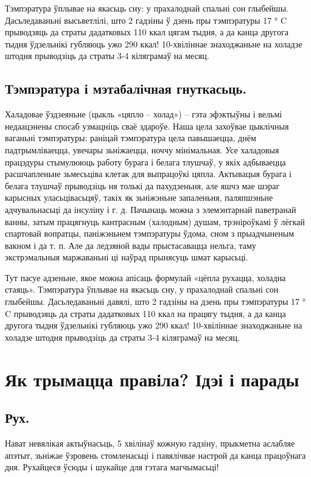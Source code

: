 Тэмпэратура ўплывае на якасьць сну: у прахалоднай спальні сон глыбейшы. Дасьледаваньні высьветлілі, што 2 гадзіны ў дзень пры тэмпэратуры 17 ° C прыводзяць да страты дадатковых 110 ккал цягам тыдня, а да канца другога тыдня ўдзельнікі губляюць ужо 290 ккал! 10-хвіліннае знаходжаньне на холадзе штодня прыводзіць да страты 3-4 кіляграмаў на месяц.

\subsection{Тэмпэратура і мэтабалічная гнуткасьць.}
Халадовае ўздзеяньне (цыкль «цяпло – холад») – гэта эфэктыўны і вельмі недаацэнены спосаб узмацніць сваё здароўе. Наша цела захоўвае цыклічныя ваганьні тэмпэратуры: раніцай тэмпэратура цела павышаецца, днём падтрымліваецца, увечары зьніжаецца, ноччу мінімальная. Усе халадовыя працэдуры стымулююць работу бурага і белага тлушчаў, у якіх адбываецца расшчапленьне зьмесьціва клетак для выпрацоўкі цяпла. Актывацыя бурага і белага тлушчаў прыводзіць ня толькі да пахудзеньня, але яшчэ мае шэраг карысных уласьцівасьцяў, такіх як зьніжэньне запаленьня, паляпшэньне адчувальнасьці да інсуліну і г. д. Пачынаць можна з элемэнтарнай паветранай ванны, затым працягнуць кантрасным (халодным) душам, трэніроўкамі ў лёгкай спартовай вопратцы, паніжэньнем тэмпэратуры ўдома, сном з прыадчыненым вакном і да т. п. Але да ледзяной вады прыстасавацца нельга, таму экстрэмальныя маржаваньні ці наўрад прынясуць шмат карысьці.

Тут пасуе адзеньне, якое можна апісаць формулай «цёпла рухацца, холадна стаяць». Тэмпэратура ўплывае на якасьць сну, у прахалоднай спальні сон глыбейшы. Дасьледаваньні давялі, што 2 гадзіны на дзень пры тэмпэратуры 17 ° C прыводзяць да страты дадатковых 110 ккал на працягу тыдня, а да канца другога тыдня ўдзельнікі губляюць ужо 290 ккал! 10-хвіліннае знаходжаньне на холадзе штодня прыводзіць да страты 3-4 кіляграмаў на месяц.

\section{Як трымацца правіла? Ідэі і парады}

\subsection{Рух.}
Нават невялікая актыўнасьць, 5 хвілінаў кожную гадзіну, прыкметна аслабляе апэтыт, зьніжае ўзровень стомленасьці і павялічвае настрой да канца працоўнага дня. Рухайцеся ўсюды і шукайце для гэтага магчымасьці!

